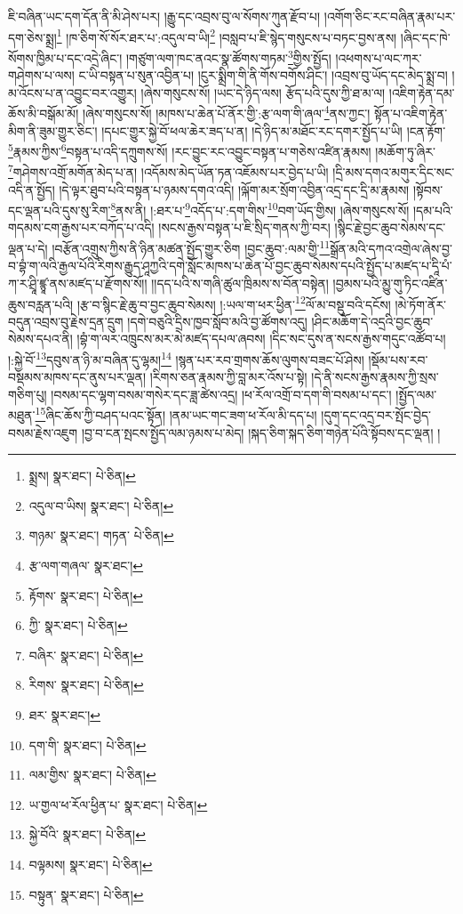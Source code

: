 ཇི་བཞིན་ཡང་དག་དོན་ནི་མི་ཤེས་པར། །རྒྱུ་དང་འབྲས་བུ་ལ་སོགས་ཀུན་རྫོབ་པ། །འགོག་ཅིང་རང་བཞིན་རྣམ་པར་དག་ཅེས་སྨྲ།\footnote{སྨྲས།  སྣར་ཐང་།  པེ་ཅིན། } །ཁ་ཅིག་སོ་སོར་ཐར་པ་:འདུལ་བ་ཡི།\footnote{འདུལ་བ་ཡིས།  སྣར་ཐང་།  པེ་ཅིན། } །བསླབ་པ་ཇི་སྙེད་གསུངས་པ་བཏང་བྱས་ནས། །ཞིང་དང་ཁེ་སོགས་ཁྱིམ་པ་དང་འདྲེ་ཞིང་། །གཙུག་ལག་ཁང་ནའང་སྣ་ཚོགས་གཏམ་\footnote{གཉམ་  སྣར་ཐང་། གཏན་  པེ་ཅིན། }གྱིས་སྤྱོད། །འཕགས་པ་ལང་ཀར་གཤེགས་པ་ལས། ང་ཡི་བསྟན་པ་སུན་འབྱིན་པ། །ངུར་སྨྲིག་གི་ནི་གོས་བགོས་ཤིང་། །འབྲས་བུ་ཡོད་དང་མེད་སྨྲ་བ། །མ་འོངས་པ་ན་འབྱུང་བར་འགྱུར། །ཞེས་གསུངས་སོ། །ཡང་དེ་ཉིད་ལས། རྩོད་པའི་དུས་ཀྱི་ཐ་མ་ལ། །འཇིག་རྟེན་དམ་ཆོས་མི་བསྒོམ་མོ། །ཞེས་གསུངས་སོ། །མཁས་པ་ཆེན་པོ་ནོར་གྱི་:རྩ་ལག་གི་ཞལ་\footnote{རྩ་ལག་གཞལ་  སྣར་ཐང་། }ནས་ཀྱང་། སྟོན་པ་འཇིག་རྟེན་མིག་ནི་ཟུམ་གྱུར་ཅིང་། །དཔང་གྱུར་སྐྱེ་བོ་ཕལ་ཆེར་ཟད་པ་ན། །དེ་ཉིད་མ་མཐོང་རང་དགར་སྤྱོད་པ་ཡི། །ངན་རྟོག་\footnote{རྟོགས་  སྣར་ཐང་།  པེ་ཅིན། }རྣམས་ཀྱིས་\footnote{ཀྱི་  སྣར་ཐང་།  པེ་ཅིན། }བསྟན་པ་འདི་དཀྲུགས་སོ། །རང་བྱུང་རང་འབྱུང་བསྟན་པ་གཅེས་འཛིན་རྣམས། །མཆོག་ཏུ་ཞིར་\footnote{བཞིར་  སྣར་ཐང་།  པེ་ཅིན། }གཤེགས་འགྲོ་མགོན་མེད་པ་ན། །འདོམས་མེད་ཡོན་ཏན་འཇོམས་པར་བྱེད་པ་ཡི། །དྲི་མས་དགའ་མགུར་དིང་སང་འདི་ན་སྤྱོད། །དེ་ལྟར་ཐུབ་པའི་བསྟན་པ་ཉམས་དགའ་འདི། །ལྐོག་མར་སྲོག་འབྱིན་འདྲ་དང་དྲི་མ་རྣམས། །སྟོབས་དང་ལྡན་པའི་དུས་སུ་རིག་\footnote{རིགས་  སྣར་ཐང་།  པེ་ཅིན། }ནས་ནི། །:ཐར་པ་\footnote{ཐར་  སྣར་ཐང་། }འདོད་པ་:དག་གིས་\footnote{དག་གི་  སྣར་ཐང་།  པེ་ཅིན། }བག་ཡོད་གྱིས། །ཞེས་གསུངས་སོ། །དམ་པའི་གདམས་ངག་རྒྱས་པར་བཀོད་པ་འདི། །སངས་རྒྱས་བསྟན་པ་ཇི་སྲིད་གནས་ཀྱི་བར། །སྙིང་རྗེ་བྱང་ཆུབ་སེམས་དང་ལྡན་པ་དེ། །བརྩོན་འགྲུས་ཀྱིས་ནི་ཉིན་མཚན་སྤྱོད་གྱུར་ཅིག །བྱང་ཆུབ་:ལམ་གྱི་\footnote{ལམ་གྱིས་  སྣར་ཐང་།  པེ་ཅིན། }སྒྲོན་མའི་དཀའ་འགྲེལ་ཞེས་བྱ་བ་བྷཾ་ག་ལའི་རྒྱལ་པོའི་རིགས་རྒྱུད་ཤཱཀྱའི་དགེ་སློང་མཁས་པ་ཆེན་པོ་བྱང་ཆུབ་སེམས་དཔའི་སྤྱོད་པ་མཛད་པ་དཱི་པཾ་ཀ་ར་ཤྲཱི་ཛྙཱ་ནས་མཛད་པ་རྫོགས་སོ།། །།དད་པའི་ས་གཞི་ཚུལ་ཁྲིམས་ས་བོན་བསྟེན། །བྱམས་པའི་མྱུ་གུ་ཏིང་འཛིན་ཆུས་བརླན་པའི། །རྩ་བ་སྙིང་རྗེ་ཆུ་བ་བྱང་ཆུབ་སེམས། །:ཡལ་ག་ཕར་ཕྱིན་\footnote{ཡ་གྱལ་ཕ་རོལ་ཕྱིན་པ་  སྣར་ཐང་།  པེ་ཅིན། }ལོ་མ་བསྡུ་བའི་དངོས། །མེ་ཏོག་ནོར་བདུན་འབྲས་བུ་རྗེས་དྲན་དྲུག །དགེ་བཅུའི་དྲིས་ཁྱབ་སློབ་མའི་བྱ་ཚོགས་འདུ། །ཤིང་མཆོག་དེ་འདྲའི་བྱང་ཆུབ་སེམས་དཔའ་ནི། །བྷཾ་ག་ལར་འཁྲུངས་མར་མེ་མཛད་དཔལ་ཞབས། །དིང་སང་དུས་ན་སངས་རྒྱས་གདུང་འཚོབ་པ། །:སྐྱེ་བོ་\footnote{སྐྱེ་བོའི་  སྣར་ཐང་།  པེ་ཅིན། }དབུས་ན་ཉི་མ་བཞིན་དུ་ལྷམ།\footnote{བལྟམས།  སྣར་ཐང་།  པེ་ཅིན། } །སྙན་པར་རབ་གྲགས་ཆོས་ལུགས་བཟང་པོ་ཤེས། །སྡོམ་པས་རབ་བསྡམས་མཁས་དང་ནུས་པར་ལྡན། །རིགས་ཅན་རྣམས་ཀྱི་བླ་མར་འོས་པ་སྟེ། །དེ་ནི་སངས་རྒྱས་རྣམས་ཀྱི་སྲས་གཅིག་པུ། །བསམ་དང་ལྷག་བསམ་གསེར་དང་ཟླ་ཚེས་འདྲ། །ཕ་རོལ་འགྲོ་བ་དག་གི་བསམ་པ་དང་། །སྤྱོད་ལམ་མཐུན་\footnote{བསྟུན་  སྣར་ཐང་།  པེ་ཅིན། }ཞིང་ཆོས་ཀྱི་བཤད་པའང་སྟོན། །ནམ་ཡང་གང་ཟག་ཕ་རོལ་མི་དད་པ། །དུག་དང་འདྲ་བར་སྤོང་བྱེད་བསམ་རྗེས་འཇུག །བྱ་བ་ངན་སྤངས་སྤྱོད་ལམ་ཉམས་པ་མེད། །སྐད་ཅིག་སྐད་ཅིག་གཉེན་པོའི་སྟོབས་དང་ལྡན། །
